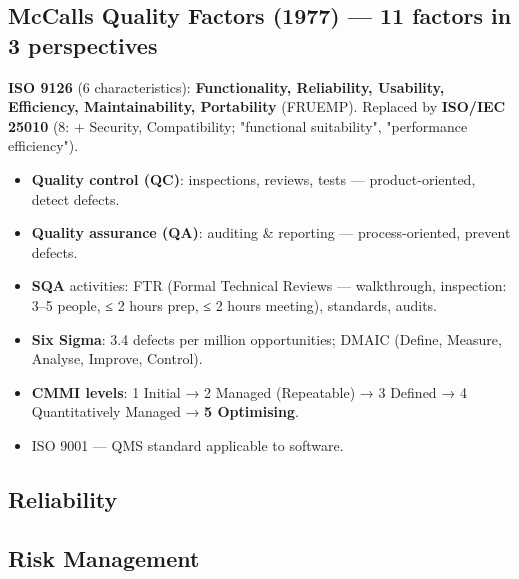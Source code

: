 \hypertarget{p2-06--mccalls-quality-factors-1977--11-factors-in-3-perspectives}{%
\subsection{McCall\textquotesingle s Quality Factors (1977) --- 11 factors in 3 perspectives}\label{p2-06--mccalls-quality-factors-1977--11-factors-in-3-perspectives}}



\textbf{ISO 9126} (6 characteristics): \textbf{Functionality, Reliability, Usability, Efficiency, Maintainability, Portability} (FRUEMP). Replaced by \textbf{ISO/IEC 25010} (8: + Security, Compatibility; "functional suitability", "performance efficiency").

\begin{itemize}
\tightlist
\item
  \textbf{Quality control (QC)}: inspections, reviews, tests --- product-oriented, detect defects.
\item
  \textbf{Quality assurance (QA)}: auditing \& reporting --- process-oriented, prevent defects.
\item
  \textbf{SQA} activities: FTR (Formal Technical Reviews --- walkthrough, inspection: 3--5 people, ≤ 2 hours prep, ≤ 2 hours meeting), standards, audits.
\item
  \textbf{Six Sigma}: 3.4 defects per million opportunities; DMAIC (Define, Measure, Analyse, Improve, Control).
\item
  \textbf{CMMI levels}: 1 Initial → 2 Managed (Repeatable) → 3 Defined → 4 Quantitatively Managed → \textbf{5 Optimising}.
\item
  ISO 9001 --- QMS standard applicable to software.
\end{itemize}

\needspace{95pt}

\hypertarget{p2-06--reliability}{%
\subsection{Reliability}\label{p2-06--reliability}}



\needspace{95pt}

\hypertarget{p2-06--risk-management}{%
\subsection{Risk Management}\label{p2-06--risk-management}}

